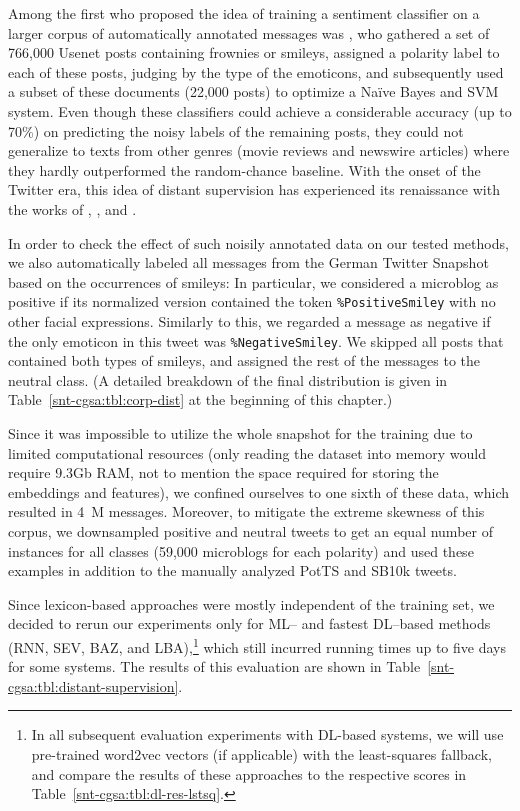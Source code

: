 Among the first who proposed the idea of training a sentiment
classifier on a larger corpus of automatically annotated messages was
\citet{Read:05}, who gathered a set of 766,000 Usenet posts containing
frownies or smileys, assigned a polarity label to each of these posts,
judging by the type of the emoticons, and subsequently used a subset
of these documents (22,000 posts) to optimize a Na{\"i}ve Bayes and
SVM system.  Even though these classifiers could achieve a
considerable accuracy (up to 70\%) on predicting the noisy labels of
the remaining posts, they could not generalize to texts from other
genres (movie reviews and newswire articles) where they hardly
outperformed the random-chance baseline. With the onset of the Twitter
era, this idea of distant supervision has experienced its renaissance
with the works of \citet{Go:09}, \citet{Pak:10}, and
\citet{Barbosa:10}.

In order to check the effect of such noisily annotated data on our
tested methods, we also automatically labeled all messages from the
German Twitter Snapshot~\cite{Scheffler:14} based on the occurrences
of smileys: In particular, we considered a microblog as positive if
its normalized version contained the token \texttt{\%PositiveSmiley}
with no other facial expressions.  Similarly to this, we regarded a
message as negative if the only emoticon in this tweet was
\texttt{\%NegativeSmiley}.  We skipped all posts that contained both
types of smileys, and assigned the rest of the messages to the neutral
class. (A detailed breakdown of the final distribution is given in
Table~\ref{snt-cgsa:tbl:corp-dist} at the beginning of this chapter.)

Since it was impossible to utilize the whole snapshot for the training
due to limited computational resources (only reading the dataset into
memory would require 9.3Gb RAM, not to mention the space required for
storing the embeddings and features), we confined ourselves to one
sixth of these data, which resulted in 4~M messages.  Moreover, to
mitigate the extreme skewness of this corpus, we downsampled positive
and neutral tweets to get an equal number of instances for all classes
(59,000 microblogs for each polarity) and used these examples in
addition to the manually analyzed PotTS and SB10k tweets.

Since lexicon-based approaches were mostly independent of the training
set, we decided to rerun our experiments only for ML-- and fastest
DL--based methods (RNN, SEV, BAZ, and LBA),\footnote{In all subsequent
  evaluation experiments with DL-based systems, we will use
  pre-trained word2vec vectors (if applicable) with the least-squares
  fallback, and compare the results of these approaches to the
  respective scores in Table~\ref{snt-cgsa:tbl:dl-res-lstsq}.} which
still incurred running times up to five days for some systems.  The
results of this evaluation are shown in
Table~\ref{snt-cgsa:tbl:distant-supervision}.

